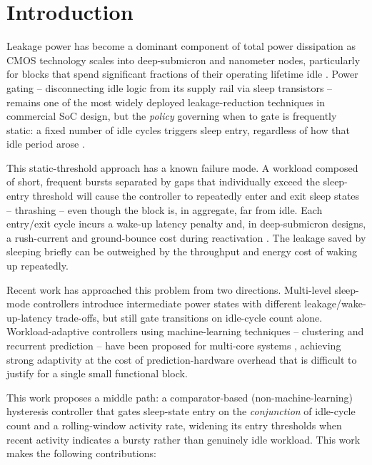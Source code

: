 \section{Introduction}

Leakage power has become a dominant component of total power dissipation as CMOS technology scales into deep-submicron and nanometer nodes, particularly for blocks that spend significant fractions of their operating lifetime idle \cite{shiva2025,sahu2025}. Power gating -- disconnecting idle logic from its supply rail via sleep transistors -- remains one of the most widely deployed leakage-reduction techniques in commercial SoC design, but the \emph{policy} governing when to gate is frequently static: a fixed number of idle cycles triggers sleep entry, regardless of how that idle period arose \cite{agarwal2006}.

This static-threshold approach has a known failure mode. A workload composed of short, frequent bursts separated by gaps that individually exceed the sleep-entry threshold will cause the controller to repeatedly enter and exit sleep states -- thrashing -- even though the block is, in aggregate, far from idle. Each entry/exit cycle incurs a wake-up latency penalty and, in deep-submicron designs, a rush-current and ground-bounce cost during reactivation \cite{chang2012}. The leakage saved by sleeping briefly can be outweighed by the throughput and energy cost of waking up repeatedly.

Recent work has approached this problem from two directions. Multi-level sleep-mode controllers \cite{agarwal2006} introduce intermediate power states with different leakage/wake-up-latency trade-offs, but still gate transitions on idle-cycle count alone. Workload-adaptive controllers using machine-learning techniques -- clustering and recurrent prediction -- have been proposed for multi-core systems \cite{karthikeyan2025}, achieving strong adaptivity at the cost of prediction-hardware overhead that is difficult to justify for a single small functional block.

This work proposes a middle path: a comparator-based (non-machine-learning) hysteresis controller that gates sleep-state entry on the \emph{conjunction} of idle-cycle count and a rolling-window activity rate, widening its entry thresholds when recent activity indicates a bursty rather than genuinely idle workload. This work makes the following contributions:

